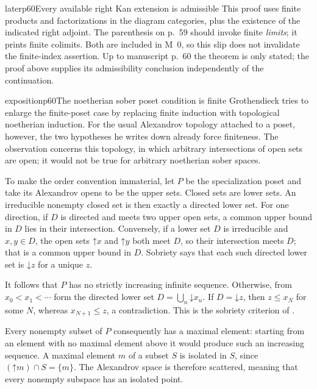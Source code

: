 \begin{dcomment}{later}{p60}{Every available right Kan extension is admissible}
This proof uses finite products and factorizations in the diagram categories, plus the existence of the indicated right adjoint. The parenthesis on p.~59 should invoke finite \emph{limits}; it prints finite colimits. Both are included in M~0, so this slip does not invalidate the finite-index assertion. Up to manuscript p.~60 the theorem is only stated; the proof above supplies its admissibility conclusion independently of the continuation.
\end{dcomment}


\begin{dcomment}{exposition}{p60}{The noetherian sober poset condition is finite}
Grothendieck tries to enlarge the finite-poset case by replacing finite induction with topological noetherian induction. For the usual Alexandrov topology attached to a poset, however, the two hypotheses he writes down already force finiteness. The observation concerns this topology, in which arbitrary intersections of open sets are open; it would not be true for arbitrary noetherian sober spaces.

To make the order convention immaterial, let $P$ be the specialization poset and take its Alexandrov opens to be the upper sets. Closed sets are lower sets. An irreducible nonempty closed set is then exactly a directed lower set. For one direction, if $D$ is directed and meets two upper open sets, a common upper bound in $D$ lies in their intersection. Conversely, if a lower set $D$ is irreducible and $x,y\in D$, the open sets $\mathord\uparrow x$ and $\mathord\uparrow y$ both meet $D$, so their intersection meets $D$; that is a common upper bound in $D$. Sobriety says that each such directed lower set is $\mathord\downarrow z$ for a unique $z$.

It follows that $P$ has no strictly increasing infinite sequence. Otherwise, from $x_0<x_1<\cdots$ form the directed lower set $D=\bigcup_n\mathord\downarrow x_n$. If $D=\mathord\downarrow z$, then $z\leq x_N$ for some $N$, whereas $x_{N+1}\leq z$, a contradiction. This is the sobriety criterion of \citet[Chapter~II, Proposition~6.4.4]{PicadoPultr2012}.

Every nonempty subset of $P$ consequently has a maximal element: starting from an element with no maximal element above it would produce such an increasing sequence. A maximal element $m$ of a subset $S$ is isolated in $S$, since $(\mathord\uparrow m)\cap S=\{m\}$. The Alexandrov space is therefore scattered, meaning that every nonempty subspace has an isolated point.


\end{dcomment}
